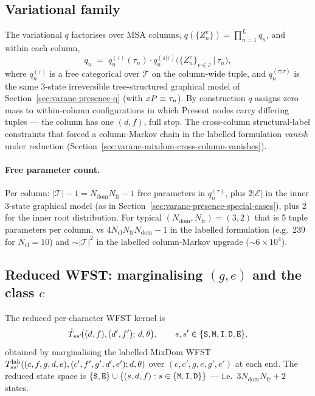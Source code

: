 \subsection{Variational family}
\label{sec:varanc-mixdom-q}

The variational $q$ factorises over MSA columns,
$q(\{Z^v_n\}) = \prod_{n=1}^L q_n$, and within each column,
\begin{equation}
\label{eq:q-mixdom-factor}
q_n \;=\; q_n^{(\tau)}(\tau_n) \cdot
          q_n^{(\pi|\tau)}\!\big(\{Z^v_n\}_{v \in \mathcal{I}} \,\big|\, \tau_n\big),
\end{equation}
where $q_n^{(\tau)}$ is a free categorical over $\mathcal{T}$ on the
column-wide tuple, and $q_n^{(\pi|\tau)}$ is the same 3-state
irreversible tree-structured graphical model of
Section~\ref{sec:varanc-presence-q} (with $x{P} \equiv \tau_n$).
By construction $q$ assigns zero mass to within-column configurations
in which Present nodes carry differing tuples — the column has one
$(d, f)$, full stop. The cross-column structural-label constraints
that forced a column-Markov chain in the labelled formulation
\emph{vanish} under reduction
(Section~\ref{sec:varanc-mixdom-cross-column-vanishes}).

\paragraph{Free parameter count.}
Per column: $|\mathcal{T}| - 1 = N_{\text{dom}} N_{\text{fr}} - 1$
free parameters in $q_n^{(\tau)}$, plus
$2 |\mathcal{E}|$ in the inner 3-state graphical model
(as in Section~\ref{sec:varanc-presence-special-cases}), plus 2 for
the inner root distribution. For typical
$(N_{\text{dom}}, N_{\text{fr}}) = (3, 2)$ that is 5 tuple
parameters per column, vs $4 N_{\text{cl}} N_{\text{fr}} N_{\text{dom}} - 1$
in the labelled formulation (e.g.\ 239 for $N_{\text{cl}} = 10$) and
$\sim |\mathcal{T}|^2$ in the labelled column-Markov upgrade
($\sim 6 \times 10^4$).

\subsection{\texorpdfstring{Reduced WFST: marginalising $(g, e)$ and the class $c$}{Reduced WFST: marginalising (g, e) and the class c}}
\label{sec:varanc-mixdom-reduced-wfst}

The reduced per-character WFST kernel is
\begin{equation}
\label{eq:reduced-WFST}
\hat{T}_{ss'}\!\big((d, f), (d', f');\, d, \theta\big),
\qquad s, s' \in \{{\tt S}, {\tt M}, {\tt I}, {\tt D}, {\tt E}\},
\end{equation}
obtained by marginalising the labelled-MixDom WFST
$T^{\text{lab}}_{ss'}((c, f, g, d, e), (c', f', g', d', e');
d, \theta)$ over $(c, c', g, e, g', e')$ at each end. The
reduced state space is $\{{\tt S}, {\tt E}\} \cup \{(s, d, f) :
s \in \{{\tt M}, {\tt I}, {\tt D}\}\}$ — i.e.\
$3 N_{\text{dom}} N_{\text{fr}} + 2$ states.

